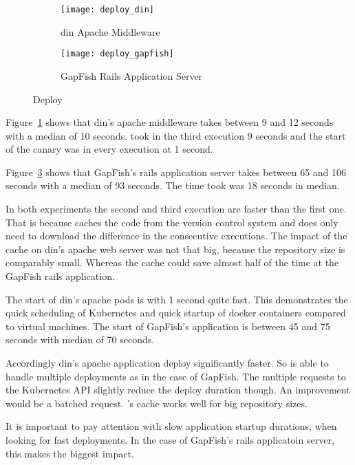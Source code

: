 \begin{figure}[htbp]
  \label{fig:deploy}
  \centering
  \begin{subfigure}{.5\textwidth}
    \texttt{[image: deploy\_din]}
    \caption[DIN]{\gls{din} Apache Middleware}
    \label{fig:deploy_din}
  \end{subfigure}%
  \begin{subfigure}{.5\textwidth}
    \texttt{[image: deploy\_gapfish]}
    \caption[GapFish]{GapFish Rails Application Server}
    \label{fig:deploy_gapfish}
  \end{subfigure}
  \caption[Deploy]{Deploy}
\end{figure}

Figure~\ref{fig:deploy_din} shows that \gls{din}'s apache middleware takes between 9 and 12
seconds with a median of 10 seconds. \deployer took in the third execution 9 seconds and
the start of the canary was in every execution at 1 second.

Figure~\ref{fig:deploy_gapfish} shows that GapFish's rails application server takes
between 65 and 106 seconds with a median of 93 seconds. The time \deployer took was 18
seconds in median.

In both experiments the second and third execution are faster than the first one. That is
because \deployer caches the code from the version control system and does only need to
download the difference in the consecutive executions. The impact of the cache on \gls{din}'s
apache web server was not that big, because the repository size is comparably
small. Whereas the cache could save almost half of the time at the GapFish rails
application.

The start of \gls{din}'s apache pods is with 1 second quite fast. This demonstrates the quick
scheduling of Kubernetes and quick startup of docker containers compared to virtual
machines. The start of GapFish's application is between 45 and 75 seconds with median of
70 seconds.

Accordingly \gls{din}'s apache application deploy significantly faster. So \deployer is able to
handle multiple deployments as in the case of GapFish. The multiple requests to the
Kubernetes API slightly reduce the deploy duration though. An improvement would be a
batched request. \deployer's cache works well for big repository sizes.

It is important to pay attention with slow application startup durations, when looking for
fast deployments. In the case of GapFish's rails applicatoin server, this makes the
biggest impact.

